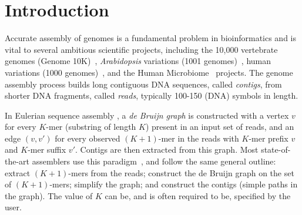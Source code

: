 \section{Introduction}\label{sec:introduction}


% 
% 
% 
% 

Accurate assembly of genomes is a fundamental problem in
bioinformatics and is vital to several ambitious scientific projects, including
the 10,000 vertebrate genomes (Genome 10K)~\cite{Haussler:2009}, \emph{Arabidopsis}
variations (1001 genomes)~\cite{Ossowski08}, human variations (1000
genomes)~\cite{Abecasis12}, and the Human Microbiome~\cite{hmp} projects. The
genome assembly process builds long contiguous DNA sequences, called {\em
contigs}, from shorter DNA fragments, called {\em reads}, typically 100-150
(DNA) symbols in length.


In Eulerian sequence assembly \cite{IW95,PTW}, a {\em de Bruijn graph} is
constructed with a vertex $v$ for every $K$-mer (substring of length $K$)
present in an input set of reads, and an edge $(v, v')$ for every observed $(K +
1)$-mer in the reads with $K$-mer prefix $v$ and $K$-mer suffix $v'$.  Contigs
are then extracted from this graph.  Most state-of-the-art assemblers use this
paradigm~\cite{bankevich2012spades,peng2010idba,Li:2010,Simpson:2009,Butler:2008}, 
and follow the same general outline: extract $(K + 1)$-mers from the reads;
construct the de Bruijn graph on the set of $(K +1)$-mers; simplify the graph; 
and construct the contigs (simple paths in the graph). The value of $K$ can be,
and is often required to be, specified by the user.

